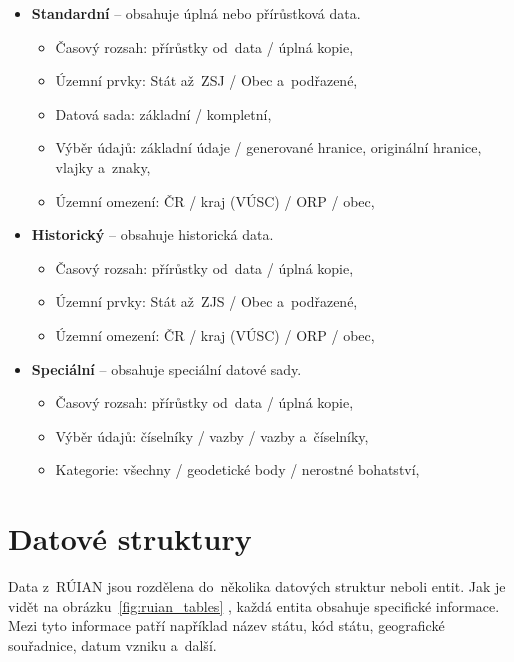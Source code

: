 \begin{itemize}
    \item \textbf{Standardní} -- obsahuje úplná nebo přírůstková data.
    \begin{itemize}[itemsep=0pt]
        \item Časový rozsah: přírůstky od~data / úplná kopie,
        \item Územní prvky: Stát až~ZSJ / Obec a~podřazené,
        \item Datová sada: základní / kompletní,
        \item Výběr údajů: základní údaje / generované hranice, originální hranice, vlajky a~znaky,
        \item Územní omezení: ČR / kraj (VÚSC) / ORP / obec,
    \end{itemize}

    \item \textbf{Historický} -- obsahuje historická data.
    \begin{itemize}[itemsep=0pt]
        \item Časový rozsah: přírůstky od~data / úplná kopie,
        \item Územní prvky: Stát až~ZJS / Obec a~podřazené,
        \item Územní omezení: ČR / kraj (VÚSC) / ORP / obec,
    \end{itemize}

    \item \textbf{Speciální} -- obsahuje speciální datové sady.
    \begin{itemize}[itemsep=0pt]
        \item Časový rozsah: přírůstky od~data / úplná kopie,
        \item Výběr údajů: číselníky / vazby / vazby a~číselníky,
        \item Kategorie: všechny / geodetické body / nerostné bohatství,
    \end{itemize}
\end{itemize}

\section{Datové struktury}
Data z~RÚIAN jsou rozdělena do~několika datových struktur neboli entit.
Jak je vidět na obrázku~\ref{fig:ruian_tables} \cite{ruian_vfr}, každá entita obsahuje specifické informace.
Mezi tyto informace patří například název státu, kód státu, geografické souřadnice, datum vzniku a~další. 

